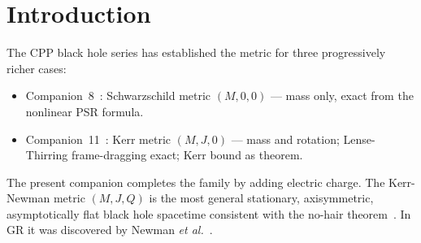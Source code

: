 \documentclass[12pt]{article}
\newcommand{\Dlt}{\Delta}
\begin{document}
\begin{abstract}
We complete the CPP charged black hole family by deriving the
Kerr-Newman metric for a rotating, charged mass $(M, J, Q)$.
Three SSV components simultaneously source the spacetime:
scalar compressive SSV from $M$ (companion~8), azimuthal vector
SSV from $J$ (companion~11), and radial vector SSV from charge $Q$
(companion~2).  The Kerr-Newman $\Delta$ function:
\begin{equation}
  \Dlt_{\rm KN} \;=\; r^2 - 2Mr + a^2 + Q^2,
  \label{eq:delta_kn_abstract}
\end{equation}
where $Q^2 = k_e Q_{\rm SI}^2 G/c^4$ in geometric units, follows
from adding the Coulomb SSV contribution to the Kerr $\Delta$.
The Kerr-Newman bound $M^2 \geq a^2 + Q^2$
(Theorem~\ref{thm:kn_bound}) is derived from SSV subluminality
at the outer horizon — generalising the Kerr bound of companion~11.
The Reissner-Nordstr\"om metric (Corollary~\ref{cor:rn}) and the
full three-parameter Kerr-Newman metric (Proposition~\ref{prop:kn})
are verified in all limiting cases.  No new postulates beyond
companion~2 and companion~11 are required.
\end{abstract}

\section{Introduction}
\label{sec:intro}

The CPP black hole series has established the metric for three
progressively richer cases:
\begin{itemize}[noitemsep]
  \item Companion~8~\cite{c8}: Schwarzschild metric $(M, 0, 0)$ —
    mass only, exact from the nonlinear PSR formula.
  \item Companion~11~\cite{c11}: Kerr metric $(M, J, 0)$ —
    mass and rotation; Lense-Thirring frame-dragging exact;
    Kerr bound as theorem.
\end{itemize}

The present companion completes the family by adding electric charge.
The Kerr-Newman metric $(M, J, Q)$ is the most general stationary,
axisymmetric, asymptotically flat black hole spacetime consistent with
the no-hair theorem~\cite{israel1967}.  In GR it was discovered by
Newman \textit{et al.}~\cite{newman1965}.
\end{document}
